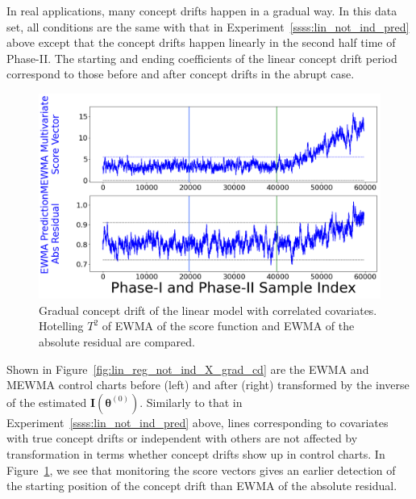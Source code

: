 \documentclass[twoside,11pt]{article}
\begin{document}
\begin{appendix}
\begin{enumerate}[(I)]
In real applications, many concept drifts happen in a gradual way. In this data set, all conditions are the same with that in Experiment~\ref{ssss:lin_not_ind_pred} above except that the concept drifts happen linearly in the second half time of Phase-II. The starting and ending coefficients of the linear concept drift period correspond to those before and after concept drifts in the abrupt case. 
\begin{figure}[!htbp]
\centering
\includegraphics[width = 0.6\linewidth]{../figures/v14/sim_6/reg/1_sim6_lin_1e-08_0_005_1.png}
  \caption{Gradual concept drift of the linear model with correlated covariates. Hotelling $T^2$ of EWMA of the score function and EWMA of the absolute residual are compared.}
  \label{fig:lin_reg_ind_X_grad_cd_comp}
\end{figure}

Shown in Figure~\ref{fig:lin_reg_not_ind_X_grad_cd} are the EWMA and MEWMA control charts before (left) and after (right) transformed by {the inverse of the estimated} ${\mathbf {I}}(\bm { \theta}^{(0)})$. Similarly to that in Experiment~\ref{ssss:lin_not_ind_pred} above, lines corresponding to covariates with true concept drifts or independent with others are not affected by transformation in terms whether concept drifts show up in control charts. In Figure~\ref{fig:lin_reg_ind_X_grad_cd_comp}, we see that monitoring the score vectors gives an earlier detection of the starting position of the concept drift than EWMA of the absolute residual.
\end{enumerate}


\end{appendix}
\end{document}
